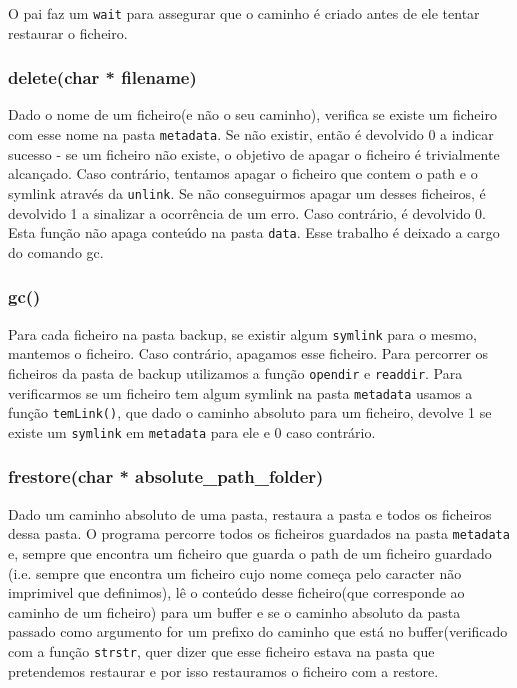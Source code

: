 O pai faz um \texttt{wait} para assegurar que o caminho é criado antes de ele tentar restaurar o ficheiro.

\subsubsection{delete(char * filename)}
Dado o nome de um ficheiro(e não o seu caminho), verifica se existe um ficheiro com esse nome na pasta \texttt{metadata}. Se não existir, então é
devolvido 0 a indicar sucesso - se um ficheiro não existe, o objetivo de apagar o ficheiro é trivialmente alcançado.
Caso contrário, tentamos apagar o ficheiro que contem o path e o symlink através da \texttt{unlink}. Se não
conseguirmos apagar um desses ficheiros, é devolvido 1 a sinalizar a ocorrência de um erro. Caso contrário, é devolvido 0.
Esta função não apaga conteúdo na pasta \texttt{data}. Esse trabalho é deixado a cargo do comando gc.

\subsubsection{gc()}
Para cada ficheiro na pasta backup, se existir algum \texttt{symlink} para o mesmo, mantemos o ficheiro. Caso contrário, apagamos esse ficheiro.
Para percorrer os ficheiros da pasta de backup utilizamos a função \texttt{opendir} e \texttt{readdir}. Para verificarmos se um ficheiro tem algum symlink
na pasta \texttt{metadata} usamos a função \texttt{temLink()}, que dado o caminho absoluto para um ficheiro, devolve 1 se existe um \texttt{symlink} em \texttt{metadata} para ele e 0 caso contrário.

\subsubsection{frestore(char * absolute\_path\_folder)}
Dado um caminho absoluto de uma pasta, restaura a pasta e todos os ficheiros dessa pasta. 
O programa percorre todos os ficheiros guardados na pasta \texttt{metadata} e, sempre que encontra um ficheiro que guarda o path de um ficheiro guardado
(i.e. sempre que encontra um ficheiro cujo nome começa pelo caracter não imprimivel que definimos),
lê o conteúdo desse ficheiro(que corresponde ao caminho de um ficheiro) para um buffer e se o caminho absoluto da pasta passado como argumento for um prefixo 
do caminho que está no buffer(verificado com a função \texttt{strstr}, quer dizer que esse ficheiro estava na pasta que pretendemos restaurar e
 por isso restauramos o ficheiro com a restore.

